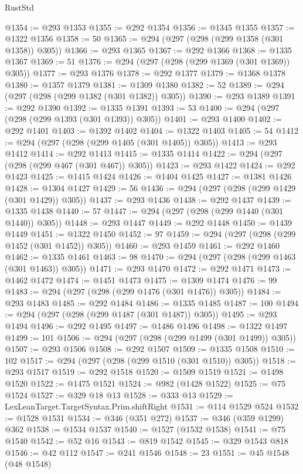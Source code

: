 \begin{lexlean}{RustStd}
\begin{coremodule}
@1354 := @293 @1353
@1355 := @292 @1354
@1356 := @1345 @1355
@1357 := @1322 @1356
@1358 := 50
@1365 := @294 (@297 (@298 (@299 @1358 (@301 @1358)) @305))
@1366 := @293 @1365
@1367 := @292 @1366
@1368 := @1335 @1367
@1369 := 51
@1376 := @294 (@297 (@298 (@299 @1369 (@301 @1369)) @305))
@1377 := @293 @1376
@1378 := @292 @1377
@1379 := @1368 @1378
@1380 := @1357 @1379
@1381 := @1309 @1380
@1382 := 52
@1389 := @294 (@297 (@298 (@299 @1382 (@301 @1382)) @305))
@1390 := @293 @1389
@1391 := @292 @1390
@1392 := @1335 @1391
@1393 := 53
@1400 := @294 (@297 (@298 (@299 @1393 (@301 @1393)) @305))
@1401 := @293 @1400
@1402 := @292 @1401
@1403 := @1392 @1402
@1404 := @1322 @1403
@1405 := 54
@1412 := @294 (@297 (@298 (@299 @1405 (@301 @1405)) @305))
@1413 := @293 @1412
@1414 := @292 @1413
@1415 := @1335 @1414
@1422 := @294 (@297 (@298 (@299 @467 (@301 @467)) @305))
@1423 := @293 @1422
@1424 := @292 @1423
@1425 := @1415 @1424
@1426 := @1404 @1425
@1427 := @1381 @1426
@1428 := @1304 @1427
@1429 := 56
@1436 := @294 (@297 (@298 (@299 @1429 (@301 @1429)) @305))
@1437 := @293 @1436
@1438 := @292 @1437
@1439 := @1335 @1438
@1440 := 57
@1447 := @294 (@297 (@298 (@299 @1440 (@301 @1440)) @305))
@1448 := @293 @1447
@1449 := @292 @1448
@1450 := @1439 @1449
@1451 := @1322 @1450
@1452 := 97
@1459 := @294 (@297 (@298 (@299 @1452 (@301 @1452)) @305))
@1460 := @293 @1459
@1461 := @292 @1460
@1462 := @1335 @1461
@1463 := 98
@1470 := @294 (@297 (@298 (@299 @1463 (@301 @1463)) @305))
@1471 := @293 @1470
@1472 := @292 @1471
@1473 := @1462 @1472
@1474 := @1451 @1473
@1475 := @1309 @1474
@1476 := 99
@1483 := @294 (@297 (@298 (@299 @1476 (@301 @1476)) @305))
@1484 := @293 @1483
@1485 := @292 @1484
@1486 := @1335 @1485
@1487 := 100
@1494 := @294 (@297 (@298 (@299 @1487 (@301 @1487)) @305))
@1495 := @293 @1494
@1496 := @292 @1495
@1497 := @1486 @1496
@1498 := @1322 @1497
@1499 := 101
@1506 := @294 (@297 (@298 (@299 @1499 (@301 @1499)) @305))
@1507 := @293 @1506
@1508 := @292 @1507
@1509 := @1335 @1508
@1510 := 102
@1517 := @294 (@297 (@298 (@299 @1510 (@301 @1510)) @305))
@1518 := @293 @1517
@1519 := @292 @1518
@1520 := @1509 @1519
@1521 := @1498 @1520
@1522 := @1475 @1521
@1524 := @982 (@1428 @1522)
@1525 := @75 @1524
@1527 := @329 @18 @13
@1528 := @333 @13
@1529 := LexLeanTarget.TargetSyntax.Prim.shiftRight
@1531 := @114 @1529 @524
@1532 := @1528 @1531
@1534 := @346 (@351 @272)
@1537 := @346 (@359 @1299) @362
@1538 := @1534 @1537
@1540 := @1527 (@1532 @1538)
@1541 := @75 @1540
@1542 := @52 @16
@1543 := @819 @1542
@1545 := @329 @1543 @818
@1546 := @42 @112
@1547 := @241 @1546
@1548 := 23
@1551 := @45 @1548 (@48 @1548)

\end{coremodule}
\end{lexlean}
